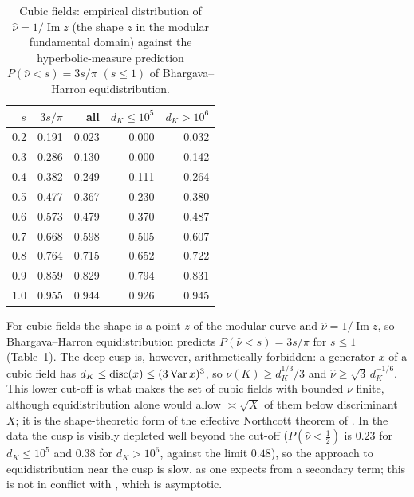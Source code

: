\begin{table}[t]\caption{Cubic fields: empirical distribution of $\hat\nu=1/\operatorname{Im}z$ (the shape $z$ in the modular fundamental domain) against the hyperbolic-measure prediction $P(\hat\nu<s)=3s/\pi$ $(s\le1)$ of Bhargava--Harron equidistribution.}\label{tab:bh}
\begin{tabular}{rrrrr}\toprule $s$ & $3s/\pi$ & all & $d_K\le10^5$ & $d_K>10^6$\\\midrule
0.2 & 0.191 & 0.023 & 0.000 & 0.032\\
0.3 & 0.286 & 0.130 & 0.000 & 0.142\\
0.4 & 0.382 & 0.249 & 0.111 & 0.264\\
0.5 & 0.477 & 0.367 & 0.230 & 0.380\\
0.6 & 0.573 & 0.479 & 0.370 & 0.487\\
0.7 & 0.668 & 0.598 & 0.505 & 0.607\\
0.8 & 0.764 & 0.715 & 0.652 & 0.722\\
0.9 & 0.859 & 0.829 & 0.794 & 0.831\\
1.0 & 0.955 & 0.944 & 0.926 & 0.945\\
\bottomrule\end{tabular}\end{table}
For cubic fields the shape is a point $z$ of the modular curve and
$\hat\nu=1/\operatorname{Im}z$, so Bhargava--Harron equidistribution predicts $P(\hat\nu<s)=3s/\pi$ for
$s\le1$ (Table~\ref{tab:bh}). The deep cusp is, however, arithmetically forbidden: a generator $x$ of a
cubic field has $d_K\le\operatorname{disc}(x)\le(3\operatorname{Var} x)^{3}$, so $\nu(K)\ge d_K^{1/3}/3$ and
$\hat\nu\ge\sqrt3\,d_K^{-1/6}$. This lower cut-off is what makes the set of cubic fields with bounded
$\nu$ finite, although equidistribution alone would allow $\asymp\sqrt X$ of them below discriminant
$X$; it is the shape-theoretic form of the effective Northcott theorem of \cite{PB}. In the data the
cusp is visibly depleted well beyond the cut-off ($P(\hat\nu<\frac12)$ is $0.23$ for $d_K\le10^{5}$
and $0.38$ for $d_K>10^{6}$, against the limit $0.48$), so the approach to equidistribution near the
cusp is slow, as one expects from a secondary term; this is not in conflict with \cite{BH}, which is
asymptotic.

